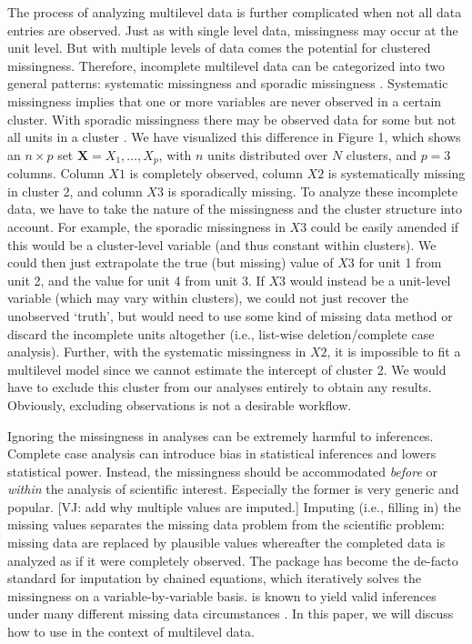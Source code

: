 \documentclass[
]{jss}
\begin{document}
The process of analyzing multilevel data is further complicated when not
all data entries are observed. Just as with single level data,
missingness may occur at the unit level. But with multiple levels of
data comes the potential for clustered missingness. Therefore,
incomplete multilevel data can be categorized into two general patterns:
systematic missingness and sporadic missingness \citep{resc13}.
Systematic missingness implies that one or more variables are never
observed in a certain cluster. With sporadic missingness there may be
observed data for some but not all units in a cluster
\citep{buur18, jola18}. We have visualized this difference in Figure 1,
which shows an \(n \times p\) set \(\mathbf{X} = X_1, \dots, X_p\), with
\(n\) units distributed over \(N\) clusters, and \(p=3\) columns. Column
\(X1\) is completely observed, column \(X2\) is systematically missing
in cluster 2, and column \(X3\) is sporadically missing. To analyze
these incomplete data, we have to take the nature of the missingness and
the cluster structure into account. For example, the sporadic
missingness in \(X3\) could be easily amended if this would be a
cluster-level variable (and thus constant within clusters). We could
then just extrapolate the true (but missing) value of \(X3\) for unit 1
from unit 2, and the value for unit 4 from unit 3. If \(X3\) would
instead be a unit-level variable (which may vary within clusters), we
could not just recover the unobserved `truth', but would need to use
some kind of missing data method or discard the incomplete units
altogether (i.e., list-wise deletion/complete case analysis). Further,
with the systematic missingness in \(X2\), it is impossible to fit a
multilevel model since we cannot estimate the intercept of cluster 2. We
would have to exclude this cluster from our analyses entirely to obtain
any results. Obviously, excluding observations is not a desirable
workflow.

Ignoring the missingness in analyses can be extremely harmful to
inferences. Complete case analysis can introduce bias in statistical
inferences and lowers statistical power. Instead, the missingness should
be accommodated \emph{before} or \emph{within} the analysis of
scientific interest. Especially the former is very generic and popular.
{[}VJ: add why multiple values are imputed.{]} Imputing (i.e., filling
in) the missing values separates the missing data problem from the
scientific problem: missing data are replaced by plausible values
whereafter the completed data is analyzed as if it were completely
observed. The  package  has become the de-facto
standard for imputation by chained equations, which iteratively solves
the missingness on a variable-by-variable basis.  is known to
yield valid inferences under many different missing data circumstances
\citep{buur18}. In this paper, we will discuss how to use  in
the context of multilevel data.
\end{document}
